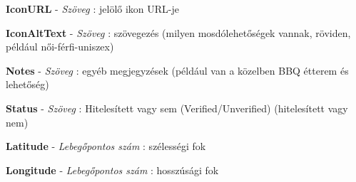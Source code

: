 \begin{compactlist}
		\item \textbf{IconURL} - \textit{Szöveg} : jelölő ikon URL-je
		\item \textbf{IconAltText} - \textit{Szöveg} : szövegezés (milyen mosdólehetőségek vannak, röviden, például női-férfi-uniszex)
		\item \textbf{Notes} - \textit{Szöveg} : egyéb megjegyzések (például van a közelben BBQ étterem és lehetőség)
		\item \textbf{Status} - \textit{Szöveg} : Hitelesített vagy sem (Verified/Unverified) (hitelesített vagy nem)
		\item \textbf{Latitude} - \textit{Lebegőpontos szám} : szélességi fok
		\item \textbf{Longitude} - \textit{Lebegőpontos szám} : hosszúsági fok
	\end{compactlist}